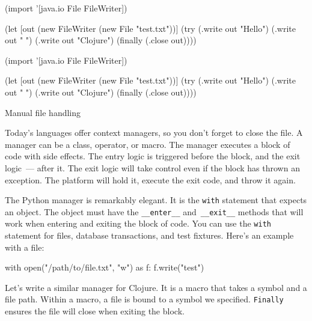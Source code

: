 \begin{listing}[ht!]

\ifnarrow

\begin{clojure}
(import '[java.io File FileWriter])

(let [out (new FileWriter
            (new File "test.txt"))]
  (try
    (.write out "Hello")
    (.write out " ")
    (.write out "Clojure")
    (finally
      (.close out))))
\end{clojure}

\else

\begin{clojure}
(import '[java.io File FileWriter])

(let [out (new FileWriter (new File "test.txt"))]
  (try
    (.write out "Hello")
    (.write out " ")
    (.write out "Clojure")
    (finally
      (.close out))))
\end{clojure}

\fi

\caption{Manual file handling}
\label{fig:write-file}

\end{listing}

Today's languages offer context managers, so you don't forget to close the file. A manager can be a class, operator, or macro.
The manager executes a block of code with side effects. The entry logic is triggered before the block, and the exit logic~--- after it. The exit logic will take control even if the block has thrown an exception.
The platform will hold it, execute the exit code, and throw it again.


The Python manager is remarkably elegant. It is the \verb|with| statement that expects an object. The object must have the \verb|__enter__| and~\verb|__exit__| methods that will work when entering and exiting the block of code. You can use the \verb|with| statement for files, database transactions, and test fixtures. Here's an example with a file:


\begin{python}
with open("/path/to/file.txt", "w") as f:
    f.write("test")
\end{python}

Let's write a similar manager for Clojure. It is a macro that takes a symbol and a file path. Within a macro, a file is bound to a symbol we specified. \verb|Finally| ensures the file will close when exiting the block.

